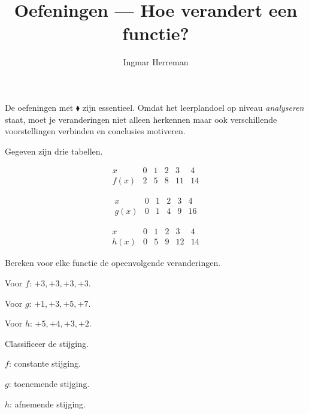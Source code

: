 \documentclass{ximera}
\title{Oefeningen — Hoe verandert een functie?}
\author{Ingmar Herreman}
\begin{document}





\maketitle
\FVDbeginExercises

\begin{opmerking}
De oefeningen met \(\blacklozenge\) zijn essentieel.
Omdat het leerplandoel op niveau \emph{analyseren} staat,
moet je veranderingen niet alleen herkennen maar ook verschillende
voorstellingen verbinden en conclusies motiveren.
\end{opmerking}





\begin{oefening}{\oefB\ESS}

Gegeven zijn drie tabellen.

\[
\begin{array}{c|ccccc}
x&0&1&2&3&4\\ \hline
f(x)&2&5&8&11&14
\end{array}
\]

\[
\begin{array}{c|ccccc}
x&0&1&2&3&4\\ \hline
g(x)&0&1&4&9&16
\end{array}
\]

\[
\begin{array}{c|ccccc}
x&0&1&2&3&4\\ \hline
h(x)&0&5&9&12&14
\end{array}
\]

\begin{question}
Bereken voor elke functie de opeenvolgende veranderingen.
\begin{oplossing}
Voor \(f\): \(+3,+3,+3,+3\).

Voor \(g\): \(+1,+3,+5,+7\).

Voor \(h\): \(+5,+4,+3,+2\).
\end{oplossing}
\end{question}

\begin{question}
Classificeer de stijging.
\begin{oplossing}
\(f\): constante stijging.

\(g\): toenemende stijging.

\(h\): afnemende stijging.
\end{oplossing}
\end{question}

\end{oefening}
\end{document}

